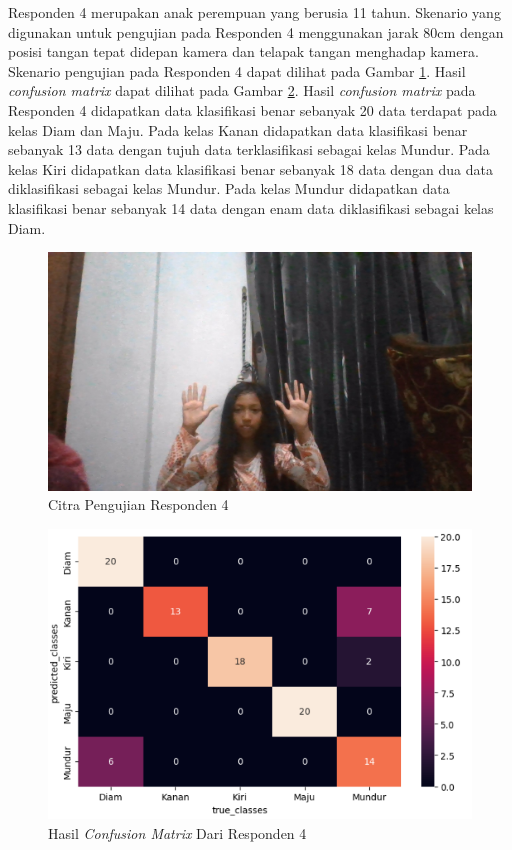\begin{enumerate}
  Responden 4 merupakan anak perempuan yang berusia 11 tahun. Skenario yang digunakan untuk pengujian pada Responden 4 menggunakan jarak 80cm dengan posisi tangan tepat didepan kamera dan telapak tangan menghadap kamera. Skenario pengujian pada Responden 4 dapat dilihat pada Gambar \ref{fig:skenarionajma}. Hasil \emph{confusion matrix} dapat dilihat pada Gambar \ref{fig:cmnajma}. Hasil \emph{confusion matrix} pada Responden 4 didapatkan data klasifikasi benar sebanyak 20 data terdapat pada kelas Diam dan Maju. Pada kelas Kanan didapatkan data klasifikasi benar sebanyak 13 data dengan tujuh data terklasifikasi sebagai kelas Mundur. Pada kelas Kiri didapatkan data klasifikasi benar sebanyak 18 data dengan dua data diklasifikasi sebagai kelas Mundur. Pada kelas Mundur didapatkan data klasifikasi benar sebanyak 14 data dengan enam data diklasifikasi sebagai kelas Diam.
    \begin{figure}[H]
      \centering
      \includegraphics[width=0.7\linewidth]{../Gambar/skenarionajma.jpg}
      \caption{Citra Pengujian Responden 4}
      \label{fig:skenarionajma}
    \end{figure}
    \begin{figure}[H]
      \centering
      \includegraphics[width=0.7\linewidth]{../Gambar/cmnajma.png}
      \caption{Hasil \emph{Confusion Matrix} Dari Responden 4}
      \label{fig:cmnajma}
    \end{figure}
\end{enumerate}

